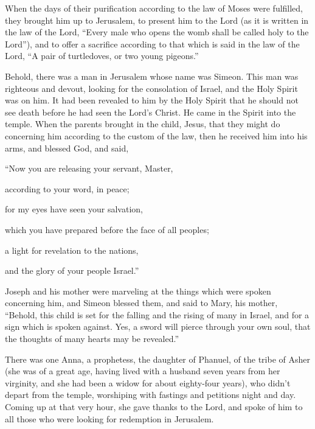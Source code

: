 {\par }{\PP {}When the days of their purification according to the law of Moses were fulfilled, they brought him up to Jerusalem, to present him to the Lord
(as it is written in the law of the Lord, “Every male who opens the womb shall be called holy to the Lord”),
and to offer a sacrifice according to that which is said in the law of the Lord, “A pair of turtledoves, or two young pigeons.”
\par }{\PP {}Behold, there was a man in Jerusalem whose name was Simeon. This man was righteous and devout, looking for the consolation of Israel, and the Holy Spirit was on him.
It had been revealed to him by the Holy Spirit that he should not see death before he had seen the Lord’s Christ.
He came in the Spirit into the temple. When the parents brought in the child, Jesus, that they might do concerning him according to the custom of the law,
then he received him into his arms, and blessed God, and said,
\par }{\Q {}“Now you are releasing your servant, Master,
\par }{\QB according to your word, in peace;
\par }{\Q {}for my eyes have seen your salvation,
\par }{\QB {}which you have prepared before the face of all peoples;
\par }{\Q {}a light for revelation to the nations,
\par }{\QB and the glory of your people Israel.”
\par }{\PP {}Joseph and his mother were marveling at the things which were spoken concerning him,
and Simeon blessed them, and said to Mary, his mother, “Behold, this child is set for the falling and the rising of many in Israel, and for a sign which is spoken against.
Yes, a sword will pierce through your own soul, that the thoughts of many hearts may be revealed.”
\par }{\PP {}There was one Anna, a prophetess, the daughter of Phanuel, of the tribe of Asher (she was of a great age, having lived with a husband seven years from her virginity,
and she had been a widow for about eighty-four years), who didn’t depart from the temple, worshiping with fastings and petitions night and day.
Coming up at that very hour, she gave thanks to the Lord, and spoke of him to all those who were looking for redemption in Jerusalem.
}
